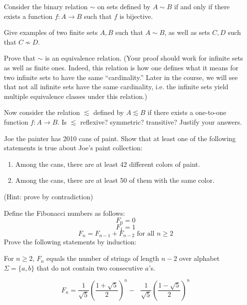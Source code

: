\documentclass[solution]{cs121}
\begin{document}
\problem{}
Consider the binary relation $\sim$ on sets defined by $A\sim B$ if and only if there exists a function $f:A\rightarrow B$ such that $f$ is bijective.

\subproblem Give examples of two finite sets $A,B$ such that $A\sim B$, as well as sets $C,D$ such that $C\not\sim D$.

\subproblem Prove that $\sim$ is an equivalence relation. (Your proof should work for infinite sets as well as finite ones.  Indeed, this relation is how one defines what it means for two infinite sets to have the same “cardinality.”  Later in the course, we will see that not all infinite sets have the same cardinality, i.e. the infinite sets yield multiple equivalence classes under this relation.) 

\subproblem Now consider the  relation $\lesssim$ defined by $A \lesssim B$ if there exists a one-to-one function $f : A \rightarrow B$.  Is $\lesssim$ reflexive? symmetric? transitive? Justify your answers.

\solution
\subproblem %
\subproblem %
\subproblem %


\problem{}
Joe the painter has 2010 cans of paint. Show that at least one of the following statements is true about Joe's paint collection: 
\begin{enumerate}
 \item Among the cans, there are at least 42 different colors of paint.
 \item Among the cans, there are at least 50 of them with the same color.
\end{enumerate}
(Hint: prove by contradiction)

\solution



\problem{}
Define the Fibonacci numbers as follows:
\[ F_0 = 0 \]
\[ F_1 = 1 \]
\[ F_n = F_{n-1} + F_{n-2} \text{ for all $n \geq 2$} \]
Prove the following statements by induction:

\subproblem
For $n\geq 2$, $F_n$ equals the number of strings of length $n-2$ over 
alphabet $\Sigma=\{a,b\}$ that do not contain two consecutive $a$'s.

\subproblem
\[F_n =
        \frac{1}{\sqrt{5}}\left(\frac{1+\sqrt{5}}{2}\right)^{n}-\text{  }
        \frac{1}{\sqrt{5}}\left(\frac{1-\sqrt{5}}{2}\right)^{n} 
\]

\solution
\subproblem %
\subproblem %
\end{document}
